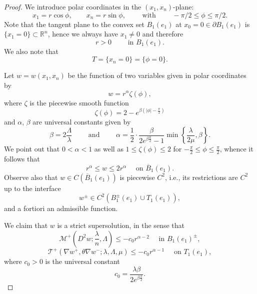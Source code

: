 \documentclass[letter,11pt]{amsart}
\newcommand{\R}{\mathbb{R}}
\newcommand{\mcal}{\mathcal{M}}
\newcommand{\tcal}{\mathcal{T}}
\theoremstyle{definition}
\numberwithin{equation}{section}
\begin{document}
\begin{proof}
\medskip

We introduce polar coordinates in the $(x_1, x_n)$-plane:
\[
x_1 = r \cos \phi, \qquad x_n = r \sin \phi, \qquad \text{ with } \qquad - \pi/2 \leq \phi \leq \pi/2.
\]
Note that the tangent plane to the convex set $B_1(e_1)$ at $x_0 = 0 \in \partial B_1(e_1)$ is 
$\{x_1 = 0\} \subset \R^{n}$,
hence we always have $x_1 \neq 0$ and therefore
\[
r > 0 \qquad \text{ in } B_1(e_1).
\]
We also note that
\[
T = \{x_n = 0\} = \{\phi = 0\}.
\]

\medskip

Let $w = w(x_1, x_n)$ be the function of two variables given in polar coordinates by
\[
w = r^{\alpha} \zeta(\phi),
\]
where $\zeta$ is the piecewise smooth function
\[
\zeta(\phi)=  2 - e^{\beta (|\phi| - \frac{\pi}{2})}
\]
and $\alpha$, $\beta$ are universal constants given by
\[
\beta = 2 \frac{\Lambda}{\lambda} 
\qquad \text{ and } \qquad 
\alpha = \frac{1}{2} \cdot \frac{\beta}{2 e^{\beta \frac{\pi}{2}}-1} \min\left\{\frac{\lambda}{2\mu}, \beta \right\}.
\]
We point out that $0 < \alpha < 1$ as well as $1 \leq \zeta(\phi) \leq 2$ for $- \frac{\pi}{2} \leq \phi\leq \frac{\pi}{2}$, whence it follows that
\[
r^{\alpha} \leq w \leq 2 r^{\alpha} \quad \text{ on } \overline{B}_1(e_1).
\]
Observe also that $w \in C(\overline{B}_1(e_1))$ is piecewise $C^2$, i.e., its restrictions are $C^2$ up to the interface
\[
w^{\pm} \in C^2(B_1^{\pm}(e_1) \cup T_1(e_1)),
\]
and a fortiori an admissible function.

\medskip

We claim that $w$ is a strict supersolution, in the sense that
\begin{equation}
\label{yor2}
\textstyle
\mcal^{+}(D^2 w; \frac{\lambda}{n}, \Lambda)
\leq 
- c_0 r^{\alpha-2} \quad \text{ in } B_1(e_1)^{\pm},
\end{equation}
\begin{equation}
\label{yor1}
\tcal^{+}(\nabla w^{+}, \theta \nabla w^{-}; \lambda, \Lambda, \mu) 
\leq - c_0 r^{\alpha-1} \quad \text{ on } T_1(e_1),
\end{equation}
where $c_0 > 0$ is the universal constant
\begin{equation}
\label{cos2}
c_0 = \frac{\lambda \beta }{2 e^{\beta\frac{\pi}{2}}}.
\end{equation}

\medskip


\end{proof}
\end{document}
